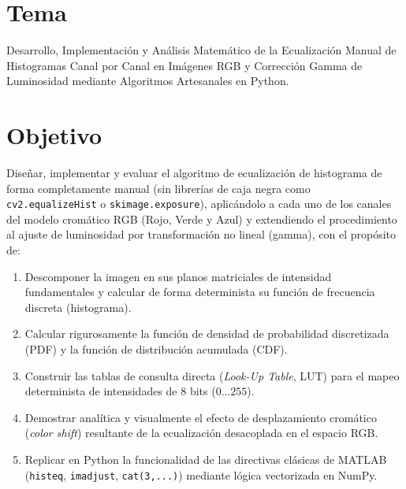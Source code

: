 \documentclass[12pt,a4paper]{article}
\begin{document}
\newpage

\tableofcontents

\newpage

\section{Tema}

Desarrollo, Implementación y Análisis Matemático de la Ecualización Manual de Histogramas Canal por Canal en Imágenes RGB y Corrección Gamma de Luminosidad mediante Algoritmos Artesanales en Python.

\section{Objetivo}

Diseñar, implementar y evaluar el algoritmo de ecualización de histograma de forma completamente manual (sin librerías de caja negra como \texttt{cv2.equalizeHist} o \texttt{skimage.exposure}), aplicándolo a cada uno de los canales del modelo cromático RGB (Rojo, Verde y Azul) y extendiendo el procedimiento al ajuste de luminosidad por transformación no lineal (gamma), con el propósito de:

\begin{enumerate}[label=\alph*)]
    \item Descomponer la imagen en sus planos matriciales de intensidad fundamentales y calcular de forma determinista su función de frecuencia discreta (histograma).
    \item Calcular rigurosamente la función de densidad de probabilidad discretizada (PDF) y la función de distribución acumulada (CDF).
    \item Construir las tablas de consulta directa (\textit{Look-Up Table}, LUT) para el mapeo determinista de intensidades de 8 bits ($0 \dots 255$).
    \item Demostrar analítica y visualmente el efecto de desplazamiento cromático (\textit{color shift}) resultante de la ecualización desacoplada en el espacio RGB.
    \item Replicar en Python la funcionalidad de las directivas clásicas de MATLAB (\texttt{histeq}, \texttt{imadjust}, \texttt{cat(3,...)}) mediante lógica vectorizada en NumPy.
\end{enumerate}
\end{document}
